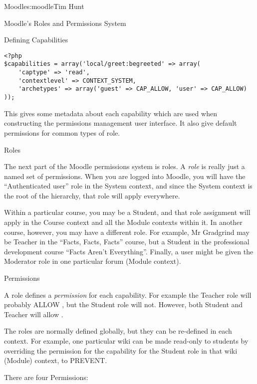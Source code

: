 \begin{aosachapter}{Moodle}{s:moodle}{Tim Hunt}
\begin{aosasect1}{Moodle's Roles and Permissions System}
\begin{aosasect2}{Defining Capabilities}
\begin{verbatim}
<?php
$capabilities = array('local/greet:begreeted' => array(
    'captype' => 'read',
    'contextlevel' => CONTEXT_SYSTEM,
    'archetypes' => array('guest' => CAP_ALLOW, 'user' => CAP_ALLOW)
));
\end{verbatim}

This gives some metadata about each capability which are used when
constructing the permissions management user interface. It also give
default permissions for common types of role.

\end{aosasect2}

\begin{aosasect2}{Roles}

The next part of the Moodle permissions system is roles. A \emph{role} is
really just a named set of permissions. When you are logged into
Moodle, you will have the ``Authenticated user'' role in the System
context, and since the System context is the root of the hierarchy,
that role will apply everywhere.

Within a particular course, you may be a Student, and that role
assignment will apply in the Course context and all the Module
contexts within it. In another course, however, you may have a
different role. For example, Mr Gradgrind may be Teacher in the
``Facts, Facts, Facts'' course, but a Student in the professional
development course ``Facts Aren't Everything''. Finally, a user might
be given the Moderator role in one particular forum (Module context).

\end{aosasect2}

\begin{aosasect2}{Permissions}

A role defines a \emph{permission} for each capability. For example
the Teacher role will probably ALLOW ,
but the Student role will not. However, both Student and Teacher will
allow .

The roles are normally defined globally, but they can be re-defined in
each context. For example, one particular wiki
can be made read-only to students by overriding
the permission for the  capability for the Student role in
that wiki (Module) context, to PREVENT.

There are four Permissions:

\begin{aosaitemize}


\end{aosaitemize}
\end{aosasect2}
\end{aosasect1}
\end{aosachapter}
